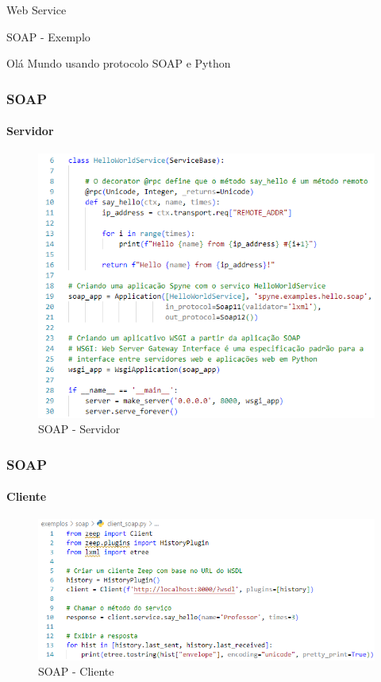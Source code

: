 \documentclass[
	9pt, %
	t, %
]{beamer}
\begin{document}
\begin{frame}
	\begin{center}
		
		\bigskip\bigskip\bigskip\bigskip %
		{\Large Web Service}
		
		\bigskip\bigskip %
		{\Huge SOAP - Exemplo}
		
		\smallskip
		{\small Olá Mundo usando protocolo SOAP e Python} 
	\end{center}

\end{frame}

\begin{frame}[fragile]
	\frametitle{SOAP}
	\framesubtitle{Servidor}
	
	\begin{figure}
		\includegraphics[width=0.7\linewidth]{server_soap.PNG}
		\caption{SOAP - Servidor}
		\label{fig:soap_server}
	\end{figure}

\end{frame}

\begin{frame}[fragile]
	\frametitle{SOAP}
	\framesubtitle{Cliente}
	
	\begin{figure}
		\includegraphics[width=0.9\linewidth]{client_soap.PNG}
		\caption{SOAP - Cliente}
		\label{fig:soap_client}
	\end{figure}

\end{frame}
\end{document}
